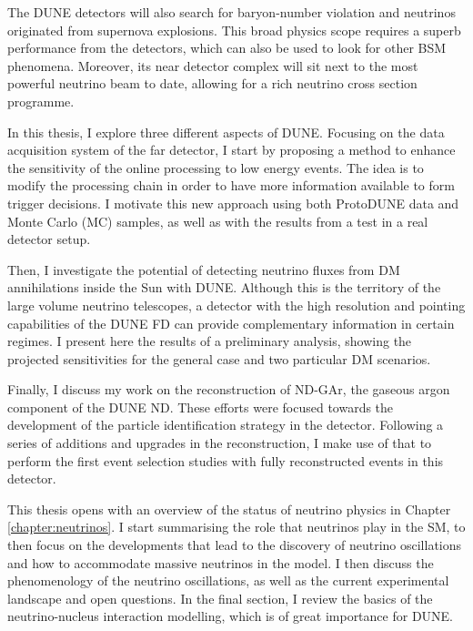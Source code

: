 The DUNE detectors will also search for baryon-number violation and neutrinos originated from supernova explosions. This broad physics scope requires a superb performance from the detectors, which can also be used to look for other BSM phenomena. Moreover, its near detector complex will sit next to the most powerful neutrino beam to date, allowing for a rich neutrino cross section programme.

In this thesis, I explore three different aspects of DUNE. Focusing on the data acquisition system of the far detector, I start by proposing a method to enhance the sensitivity of the online processing to low energy events. The idea is to modify the processing chain in order to have more information available to form trigger decisions. I motivate this new approach using both ProtoDUNE data and Monte Carlo (MC) samples, as well as with the results from a test in a real detector setup.

Then, I investigate the potential of detecting neutrino fluxes from DM annihilations inside the Sun with DUNE. Although this is the territory of the large volume neutrino telescopes, a detector with the high resolution and pointing capabilities of the DUNE FD can provide complementary information in certain regimes. I present here the results of a preliminary analysis, showing the projected sensitivities for the general case and two particular DM scenarios.

Finally, I discuss my work on the reconstruction of ND-GAr, the gaseous argon component of the DUNE ND. These efforts were focused towards the development of the particle identification strategy in the detector. Following a series of additions and upgrades in the reconstruction, I make use of that to perform the first event selection studies with fully reconstructed events in this detector.

This thesis opens with an overview of the status of neutrino physics in Chapter \ref{chapter:neutrinos}. I start summarising the role that neutrinos play in the SM, to then focus on the developments that lead to the discovery of neutrino oscillations and how to accommodate massive neutrinos in the model. I then discuss the phenomenology of the neutrino oscillations, as well as the current experimental landscape and open questions. In the final section, I review the basics of the neutrino-nucleus interaction modelling, which is of great importance for DUNE.

